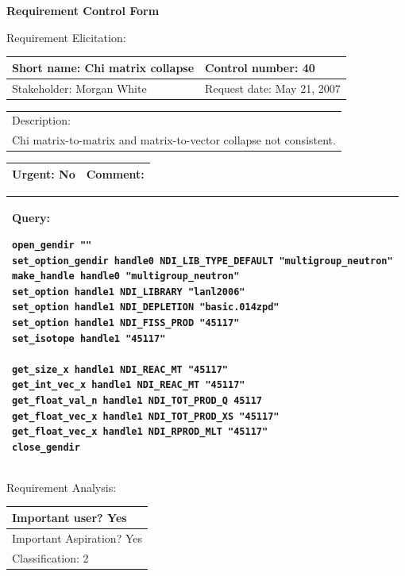 \begin{center}\Large\bf
Requirement Control Form
\end{center}
\vspace{24pt}

Requirement Elicitation:

\begin{tabular}{|p{211pt}|p{211pt}|} \hline
Short name: Chi matrix collapse & Control number: 40\\ \hline
Stakeholder: Morgan White & Request date: May 21, 2007\\
\end{tabular}
\begin{tabular}{|p{433pt}|} \hline
Description: \\ 
Chi matrix-to-matrix and matrix-to-vector collapse not consistent.\\
\hline
\end{tabular} 
\begin{tabular}{|p{211pt}|p{211pt}|} \hline
Urgent: No & Comment: \\ \hline
\end{tabular}

\vspace{12pt}

\begin{tabular}{|p{433pt}|} \hline
Query: 
\begin{verbatim}
open_gendir ""
set_option_gendir handle0 NDI_LIB_TYPE_DEFAULT "multigroup_neutron"
make_handle handle0 "multigroup_neutron"
set_option handle1 NDI_LIBRARY "lanl2006"
set_option handle1 NDI_DEPLETION "basic.014zpd"
set_option handle1 NDI_FISS_PROD "45117"
set_isotope handle1 "45117"

get_size_x handle1 NDI_REAC_MT "45117"
get_int_vec_x handle1 NDI_REAC_MT "45117"
get_float_val_n handle1 NDI_TOT_PROD_Q 45117
get_float_vec_x handle1 NDI_TOT_PROD_XS "45117"
get_float_vec_x handle1 NDI_RPROD_MLT "45117"
close_gendir
\end{verbatim}
\\ \hline
\end{tabular}
\vspace{24pt}

Requirement Analysis:

\begin{tabular}{|p{433pt}|} \hline
Important user? Yes \\ \hline
Important Aspiration? Yes \\ \hline
Classification: 2 \\ \hline
\end{tabular}
\vspace{24pt}

